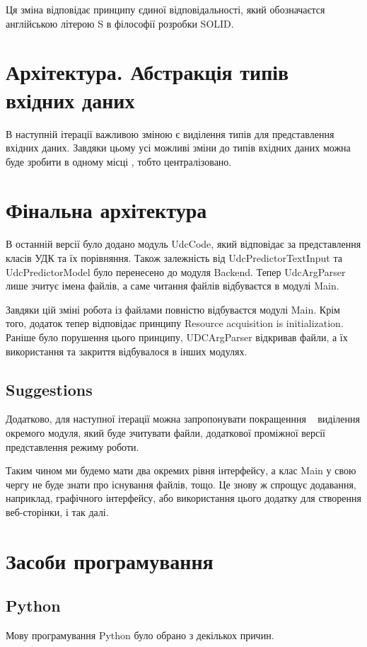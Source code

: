 \documentclass{article}
\let\oldsection\section
\renewcommand{\section}{\clearpage\oldsection}
\begin{document}
Ця зміна відповідає принципу єдиної відповідальності,
який обозначаєтся англійською літерою S в філософії розробки SOLID.

\section{Архітектура. Абстракція типів вхідних даних}
В наступній ітерації важливою зміною є виділення типів для представлення вхідних даних.
Завдяки цьому усі можливі зміни до типів вхідних даних можна буде зробити в одному місці
, тобто централізовано.

\section{Фінальна архітектура}
В останній версії було додано модуль UdcCode, який відповідає за представлення
класів УДК та їх порівняння. Також залежність від UdcPredictorTextInput
та UdcPredictorModel було перенесено до модуля Backend.
Тепер UdcArgParser лише зчитує імена файлів, а саме читання файлів відбуваєтся
в модулі Main.

Завдяки цій зміні робота із файлами повністю відбуваєтся модулі Main.
Крім того, додаток тепер відповідає принципу Resource acquisition is initialization.
Раніше було порушення цього принципу, UDCArgParser відкривав файли, 
а їх використання та закриття відбувалося в інших модулях.

\subsection{Suggestions}
Додатково, для наступної ітерації можна запропонувати покращенння \textemdash~
виділення окремого модуля, який буде зчитувати файли, додаткової проміжної
версії представлення режиму роботи.

Таким чином ми будемо мати два окремих рівня інтерфейсу,
а клас Main у свою чергу не буде знати про існування файлів, тощо.
Це знову ж спрощує додавання, наприклад, графічного інтерфейсу,
або використання цього додатку для створення веб-сторінки, і так далі.

\section{Засоби програмування}

\subsection{Python}
Мову програмування Python було обрано з декількох причин.
\end{document}
